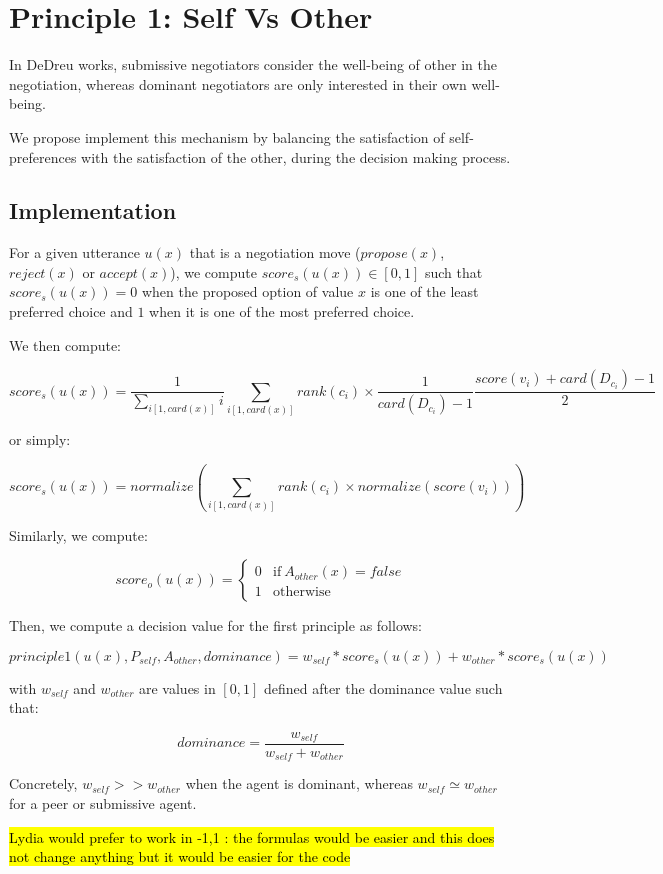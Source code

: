 \documentclass{llncs}
\begin{document}
\section{Principle 1: Self Vs Other}
In DeDreu works, submissive negotiators consider the well-being of other in the negotiation, whereas dominant negotiators are only interested in their own well-being. 

We propose implement this mechanism by balancing the satisfaction of self-preferences with the satisfaction of the other, during the decision making process.

\subsection{Implementation}
For a given utterance $u(x)$ that is a negotiation move ($propose(x)$, $reject(x)$ or $accept(x)$), we compute $score_s(u(x))\in[0,1]$ such that $score_s(u(x))=0$ when the proposed option of value $x$ is one of the least preferred choice and $1$ when it is one of the most preferred choice.

We then compute: 

$$score_s(u(x)) = \frac{1}{\sum_{i[1,card(x)]} i} \sum_{i[1,card(x)]} rank(c_i)\times \frac{1}{card(D_{c_i})-1} \frac{score(v_i)+card(D_{c_i})-1}{2} $$

or simply:

$$score_s(u(x)) = normalize \left( \sum_{i[1,card(x)]} rank(c_i)\times normalize ( score(v_i) ) \right) $$


Similarly, we compute:

$$score_o(u(x)) = \left\{\begin{array}{ll}
0 & \mathrm{if\ }A_{other}(x)= false\\
1 & \mathrm{otherwise}
\end{array}\right.$$

Then, we compute a decision value for the first principle as follows:

$$principle1(u(x),P_{self},A_{other},dominance) = w_{self} * score_s(u(x)) + w_{other} * score_s(u(x))$$

with $w_{self}$ and $w_{other}$ are values in $[0,1]$ defined after the dominance value such that:

$$dominance = \frac{w_{self}}{w_{self}+w_{other}}$$

Concretely, $w_{self}>>w_{other}$ when the agent is dominant, whereas $w_{self}\simeq w_{other}$ for a peer or submissive agent.


\hl{Lydia would prefer to work in -1,1 : the formulas would be easier and this does not change anything but it would be easier for the code}
\end{document}
